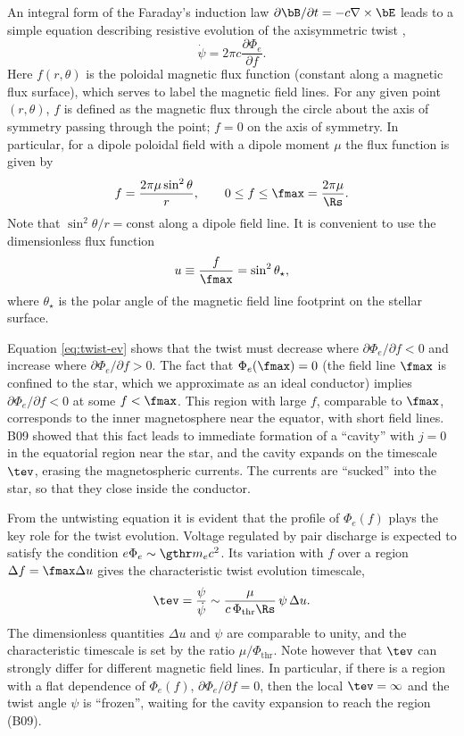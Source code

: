An integral form of the Faraday's induction law $\partial \bB/\partial t=-c\nabla\times\bE$
leads to a simple equation describing
resistive evolution of the
axisymmetric twist
\citep{2011ASSP...21..299B},
\begin{equation}
  \label{eq:twist-ev}
  \dot{\psi} = 2\pi c \frac{\partial\Phi_{e}}{\partial f}.
\end{equation}
Here $f(r,\theta)$ is the poloidal magnetic flux function (constant along a magnetic flux
surface), which serves to label the magnetic field lines. For any given point $(r,\theta)$,
$f$ is defined as the magnetic flux through the circle about the axis of symmetry
passing through the point; $f = 0$ on the axis of symmetry.
In particular, for a dipole poloidal field with a dipole moment $\mu$ the flux
function is given by
\begin{equation}
  f = \frac{2\pi\mu \sin^2\theta}{r}, \qquad 0\leq f \leq \fmax=\frac{2\pi\mu}{\Rs}.
\end{equation}
Note that $\sin^2\theta/r=\mathrm{const}$ along a dipole field line. It is convenient to use the
dimensionless flux function
\begin{equation}
\label{eq:u}
  u\equiv\frac{f}{\fmax}=\sin^2\theta_\star,
\end{equation}
 where $\theta_\star$ is the polar angle of the magnetic field line footprint on the stellar
surface.

Equation \eqref{eq:twist-ev} shows that the twist must decrease where
$\partial\Phi_{e}/\partial f < 0$ and increase where $\partial\Phi_{e}/\partial
f > 0$. The fact that $\Phi_e(\fmax)=0$ (the field line $\fmax$ is confined to
the star, which we approximate as an ideal conductor) implies
$\partial\Phi_e/\partial f<0$ at some $f<\fmax$. This region with large $f$,
comparable to $\fmax$, corresponds to the inner magnetosphere near the equator,
with short field lines. B09 showed that this fact leads to immediate formation
of a ``cavity'' with $j=0$ in the equatorial region near the star, and the
cavity expands on the timescale $\tev$, erasing the magnetospheric currents. The
currents are ``sucked'' into the star, so that they close inside the conductor.

From the untwisting equation it is evident that the profile of $\Phi_e(f)$ plays the
key role for the twist evolution. Voltage regulated by pair discharge is expected to
satisfy the condition $e\Phi_e\sim \gthr m_ec^2$.
Its variation with $f$ over a region $\Delta f=\fmax \Delta u$ gives the characteristic
twist evolution timescale,
\begin{equation}
  \label{eq:tev}
  \tev=\frac{\psi}{\dot{\psi}} \sim
  \frac{\mu}{c\,\Phi_\mathrm{thr}\Rs}\,\psi\,\Delta u.
\end{equation}
The dimensionless quantities $\Delta u$ and $\psi$ are comparable to unity,
and the characteristic timescale is set by the ratio $\mu /\Phi_\mathrm{thr}$.
Note however that $\tev$ can strongly differ for different magnetic field lines.
In particular, if there is a region with a flat dependence of $\Phi_e(f)$,
$\partial\Phi_e/\partial f=0$,
then the local $\tev=\infty$ and the twist angle $\psi$ is ``frozen'', waiting for the cavity
expansion to reach the region (B09).

